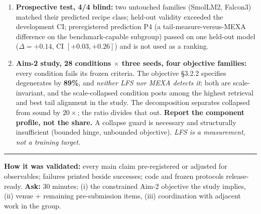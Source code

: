 \documentclass[10pt,a4paper]{article}
\begin{document}
\begin{enumerate}[leftmargin=1.35em, itemsep=0.35mm, parsep=0pt, topsep=1mm]
does not transfer: see the Aim-2 entry below.
\item \textbf{Prospective test, 4/4 blind:} two untouched families (SmolLM2,
Falcon3) matched their predicted recipe class; held-out validity exceeded the
development CI; preregistered prediction P4 (a tail-measure-versus-MEXA difference on the benchmark-capable subgroup) passed on one held-out model ($\Delta = +0.14$, CI $[+0.03, +0.26]$) and is not used as a ranking.
\item \textbf{Aim-2 study, 28 conditions $\times$ three seeds, four objective
families:} every condition fails its frozen criteria. The objective \S3.2.2
specifies degenerates by \textbf{89\%}, and \emph{neither LFS nor MEXA detects
it}: both are scale-invariant, and the scale-collapsed condition posts among the highest
retrieval and best tail alignment in the study. The decomposition separates
collapsed from sound by $20\times$; the ratio divides that out.
\textbf{Report the component profile, not the share.} A collapse guard is
necessary and structurally insufficient (bounded hinge, unbounded objective).
\emph{LFS is a measurement, not a training target.}
\end{enumerate}

\vspace{0.8mm}\hrule\vspace{1.2mm}
{\small \textbf{How it was validated:} every main claim pre-registered or
adjusted for observables; failures printed beside successes; code and
frozen protocols release-ready. \quad \textbf{Ask:} 30 minutes; (i) the
constrained Aim-2 objective the study implies, (ii) venue + remaining
pre-submission items, (iii) coordination with adjacent work in the group.}
\end{document}
